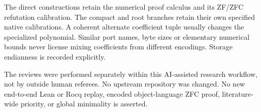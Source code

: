 \documentclass[11pt]{article}
\theoremstyle{definition}\newtheorem{definition}[theorem]{Definition}
\theoremstyle{remark}\newtheorem{remark}[theorem]{Remark}
\begin{document}
The direct constructions retain the numerical proof calculus and its
ZF/ZFC refutation calibration. The compact and root branches retain their
own specified native calibrations. A coherent alternate coefficient tuple
usually changes the specialized polynomial. Similar port names, byte sizes
or elementary numerical bounds never license mixing coefficients from
different encodings. Storage endianness is recorded explicitly.

The reviews were performed separately within this AI-assisted research
workflow, not by outside human referees. No upstream repository was changed.
No new end-to-end Lean or Rocq replay, encoded object-language ZFC proof,
literature-wide priority, or global minimality is asserted.
\appendix


\end{document}
